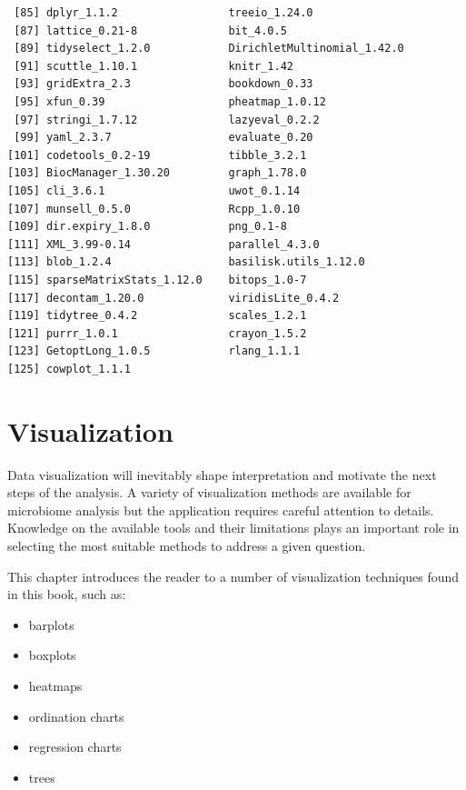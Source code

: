 \documentclass[
]{book}
\providecommand{\tightlist}{%
  \setlength{\itemsep}{0pt}\setlength{\parskip}{0pt}}
\begin{document}
\begin{verbatim}
 [85] dplyr_1.1.2                 treeio_1.24.0              
 [87] lattice_0.21-8              bit_4.0.5                  
 [89] tidyselect_1.2.0            DirichletMultinomial_1.42.0
 [91] scuttle_1.10.1              knitr_1.42                 
 [93] gridExtra_2.3               bookdown_0.33              
 [95] xfun_0.39                   pheatmap_1.0.12            
 [97] stringi_1.7.12              lazyeval_0.2.2             
 [99] yaml_2.3.7                  evaluate_0.20              
[101] codetools_0.2-19            tibble_3.2.1               
[103] BiocManager_1.30.20         graph_1.78.0               
[105] cli_3.6.1                   uwot_0.1.14                
[107] munsell_0.5.0               Rcpp_1.0.10                
[109] dir.expiry_1.8.0            png_0.1-8                  
[111] XML_3.99-0.14               parallel_4.3.0             
[113] blob_1.2.4                  basilisk.utils_1.12.0      
[115] sparseMatrixStats_1.12.0    bitops_1.0-7               
[117] decontam_1.20.0             viridisLite_0.4.2          
[119] tidytree_0.4.2              scales_1.2.1               
[121] purrr_1.0.1                 crayon_1.5.2               
[123] GetoptLong_1.0.5            rlang_1.1.1                
[125] cowplot_1.1.1              
\end{verbatim}

\hypertarget{viz-chapter}{%
\chapter{Visualization}\label{viz-chapter}}

Data visualization will inevitably shape interpretation and motivate
the next steps of the analysis. A variety of visualization methods are
available for microbiome analysis but the application requires careful
attention to details. Knowledge on the available tools and their
limitations plays an important role in selecting the most suitable
methods to address a given question.

This chapter introduces the reader to a number of visualization
techniques found in this book, such as:

\begin{itemize}
\tightlist
\item
  barplots
\item
  boxplots
\item
  heatmaps
\item
  ordination charts
\item
  regression charts
\item
  trees
\end{itemize}
\end{document}
